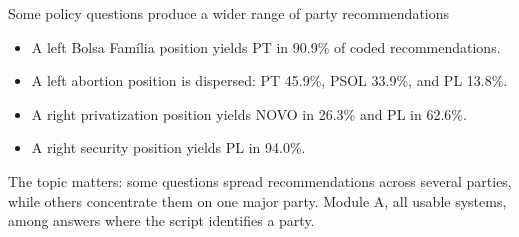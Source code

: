\documentclass[aspectratio=169,11pt]{beamer}
\newcommand{\source}[1]{\vfill{\fontsize{8}{10}\selectfont\color{muted}#1}}
\begin{document}
\begin{frame}{Some policy questions produce a wider range of party recommendations}
\begin{itemize}
\item A left Bolsa Fam\'ilia position yields PT in 90.9\% of coded recommendations.
\item A left abortion position is dispersed: PT 45.9\%, PSOL 33.9\%, and PL 13.8\%.
\item A right privatization position yields NOVO in 26.3\% and PL in 62.6\%.
\item A right security position yields PL in 94.0\%.
\end{itemize}
\vspace{.25cm}
The topic matters: some questions spread recommendations across several parties, while others concentrate them on one major party.
\source{Module A, all usable systems, among answers where the script identifies a party.}
\end{frame}
\end{document}
